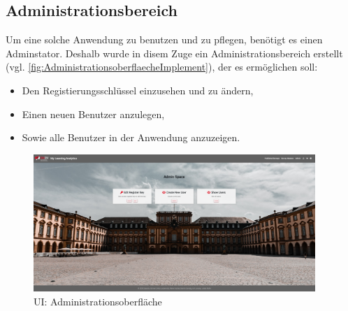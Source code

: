 
\subsection{Administrationsbereich}
\label{ssec:Administrationsbereich}

Um eine solche Anwendung zu benutzen und zu pflegen, benötigt es einen Adminstator. 
Deshalb wurde in disem Zuge ein Administrationsbereich erstellt (vgl. \vref{fig:AdministrationsoberflaecheImplement}), der es ermöglichen soll: 
\begin{itemize}
    \item Den Registierungsschlüssel einzusehen und zu ändern,
    \item Einen neuen Benutzer anzulegen,
    \item Sowie alle Benutzer in der Anwendung anzuzeigen. 
\end{itemize}

\begin{figure}[hp]
	\centering
	\includegraphics[width=0.95\textwidth, keepaspectratio]{img/client/Admin.png}
	\captionsetup{justification=centering, format=plain}
	\caption[\acf{UI}: Administrationsoberfläche]{\acf{UI}: Administrationsoberfläche \\ \quelleScreenshot}
	\label{fig:AdministrationsoberflaecheImplement}
\end{figure}







